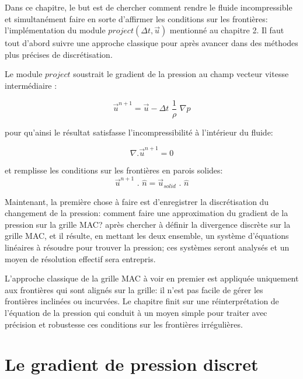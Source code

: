 \documentclass[11pt]{report}
\begin{document}
Dans ce chapitre, le but est de chercher comment rendre le fluide incompressible et simultanément faire en sorte d'affirmer les conditions sur les frontières: l'implémentation du module $project(\Delta t, \overrightarrow{u})$ mentionné au chapitre 2. Il faut tout d'abord suivre une approche classique pour après avancer dans  des méthodes plus précises de discrétisation.

Le module $project$ soustrait le gradient de la pression au champ vecteur vitesse intermédiaire :

\begin{equation}
\overrightarrow{u}^{n+1} = \overrightarrow{u} - \Delta t \,\, \frac{1}{\rho} \,\, \nabla p 
\end{equation}

pour qu'ainsi le résultat satisfasse l'incompressibilité à l'intérieur du fluide:

\begin{equation}
\nabla . \overrightarrow{u}^{n+1} = 0
\end{equation}

et remplisse les conditions sur les frontières en parois solides:
\begin{equation}
\overrightarrow{u}^{n+1} \,\, . \,\, \hat{n} = \overrightarrow{u}_{solid} \,\, . \,\, \hat{n}
\end{equation}

Maintenant, la première chose à faire est d'enregistrer la discrétisation du changement de la pression: comment faire une approximation du gradient de la pression sur la grille MAC? après chercher à définir la divergence discrète sur la grille MAC, et il résulte, en mettant les deux ensemble, un système d'équations linéaires à résoudre pour trouver la pression; ces systèmes seront analysés et un moyen de résolution effectif sera entrepris. \newline

L'approche classique de la grille MAC à voir en premier est appliquée uniquement aux frontières qui sont alignés sur la grille: il n'est pas facile de gérer les frontières inclinées ou incurvées. Le chapitre finit sur une réinterprétation de l'équation de la pression qui conduit à un moyen simple pour traiter avec précision et robustesse ces conditions sur les frontières irrégulières. \newline

\section{Le gradient de pression discret}
\end{document}
